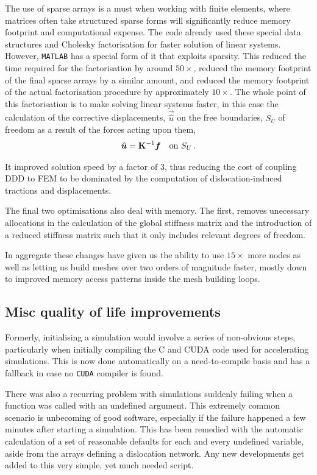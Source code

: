 The use of sparse arrays is a must when working with finite elements, where matrices often take structured sparse forms will significantly reduce memory footprint and computational expense. The code already used these special data structures and Cholesky factorisation for faster solution of linear systems. However, \texttt{MATLAB} has a special form of it that exploits sparsity. This reduced the time required for the factorisation by around $50\times$, reduced the memory footprint of the final sparse arrays by a similar amount, and reduced the memory footprint of the actual factorisation procedure by approximately $10 \times$. The whole point of this factorisation is to make solving linear systems faster, in this case the calculation of the corrective displacements, $\vec{\hat{u}}$ on the free boundaries, $S_U$ of freedom as a result of the forces acting upon them,
\begin{align}
    \vec{\hat{u}} = \mtx{K}^{-1} \vec{f}\quad \text{on } S_U\,.
\end{align}

It improved solution speed by a factor of 3, thus reducing the cost of coupling DDD to FEM to be dominated by the computation of dislocation-induced tractions and displacements.

The final two optimisations also deal with memory. The first, removes unecessary allocations in the calculation of the global stiffness matrix and the introduction of a reduced stiffness matrix such that it only includes relevant degrees of freedom.

In aggregate these changes have given us the ability to use $15 \times$ more nodes as well as letting us build meshes over two orders of magnitude faster, mostly down to improved memory access patterns inside the mesh building loops.

\subsection{Misc quality of life improvements}\label{s:qol}

Formerly, initialising a simulation would involve a series of non-obvious steps, particularly when initially compiling the C and CUDA code used for accelerating simulations. This is now done automatically on a need-to-compile basis and has a fallback in case no \texttt{CUDA} compiler is found.

There was also a recurring problem with simulations suddenly failing when a function was called with an undefined argument. This extremely common scenario is unbecoming of good software, especially if the failure happened a few minutes after starting a simulation. This has been remedied with the automatic calculation of a set of reasonable defaults for each and every undefined variable, aside from the arrays defining a dislocation network. Any new developments get added to this very simple, yet much needed script.

